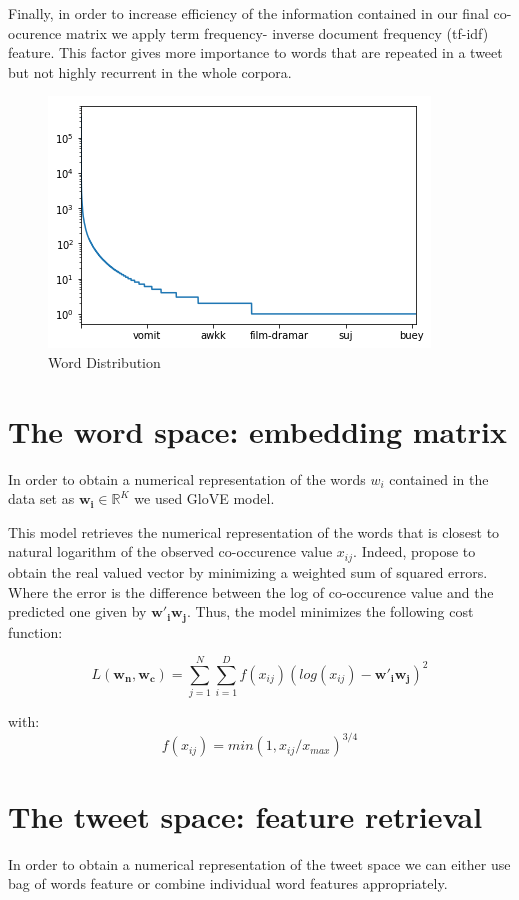 \documentclass[10pt,conference,compsocconf]{IEEEtran}
\begin{document}
Finally, in order to increase efficiency of the information contained in our final co-ocurence matrix we apply term frequency- inverse document frequency (tf-idf) feature. This factor gives more importance to words that are repeated in a tweet but not highly recurrent in the whole corpora.  

\begin{tiny}
		\begin{figure}[b] \label{fig1}
			\includegraphics[scale=0.5]{WordDistribution.png}   
			\caption{Word Distribution }
			\label{fig1}    
		\end{figure}
\end{tiny}

\section{The word space: embedding matrix }
\label{S1}
In order to obtain a numerical representation of the words $w_i$ contained in the data set  as $\textbf{w}_{\textbf{i}} \in \mathbb{R}^K$ we used GloVE model. 

This model retrieves the numerical representation of the words that is closest to natural logarithm of the observed co-occurence value $x_{ij}$. Indeed,  \cite{pennington2014glove} propose to obtain the real valued vector by minimizing a weighted sum of squared errors. Where the error is the difference between the log of co-occurence value and the predicted one given by $\textbf{w}'_{\textbf{i}}\textbf{w}_{\textbf{j}}$. Thus, the model minimizes the following cost function: 

$$L(\textbf{w}_{\textbf{n}},\textbf{w}_{\textbf{c}})=\sum_{j=1}^{N}\sum_{i=1}^{D}f(x_{ij})(log(x_{ij})-\textbf{w}'_{\textbf{i}}\textbf{w}_{\textbf{j}})^2$$ 

with: 
$$f(x_{ij})=min(1,x_{ij}/x_{max})^{3/4}$$ 
\section{The tweet space: feature retrieval}
In order to obtain a numerical representation of the tweet space we can either use bag of words feature or combine individual word features appropriately.
\end{document}
